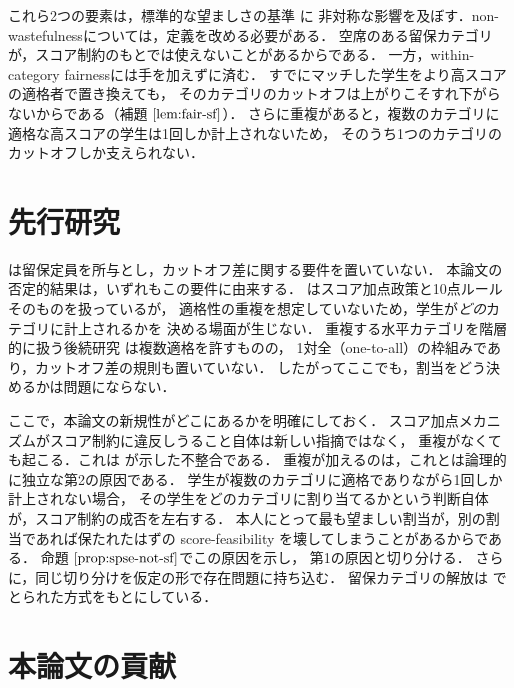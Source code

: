 \documentclass[
    12pt,          %
    a4paper,       %
    oneside,       %
    onecolumn,     %
    titlepage,     %
    final          %
]{jreport} %
\newcommand{\refpropositional}[1]{命題 $\ref{#1}$}
\newcommand{\reflemma}[1]{補題 $\ref{#1}$}
\begin{document}
これら2つの要素は，標準的な望ましさの基準 \citep{EHYY14a,KHIY17a,GKK+17a} に
非対称な影響を及ぼす．non-wastefulnessについては，定義を改める必要がある．
空席のある留保カテゴリが，スコア制約のもとでは使えないことがあるからである．
一方，within-category fairnessには手を加えずに済む．
すでにマッチした学生をより高スコアの適格者で置き換えても，
そのカテゴリのカットオフは上がりこそすれ下がらないからである（\reflemma{lem:fair-sf}）．
さらに重複があると，複数のカテゴリに適格な高スコアの学生は1回しか計上されないため，
そのうち1つのカテゴリのカットオフしか支えられない．

\section{先行研究}
\label{sec:related}

\citet{SoYe22a} は留保定員を所与とし，カットオフ差に関する要件を置いていない．
本論文の否定的結果は，いずれもこの要件に由来する．
\citet{AyTu23b} はスコア加点政策と10点ルールそのものを扱っているが，
適格性の重複を想定していないため，学生が\emph{どの}カテゴリに計上されるかを
決める場面が生じない．
重複する水平カテゴリを階層的に扱う後続研究 \citep{AyTu26a} は複数適格を許すものの，
1対全（one-to-all）の枠組みであり，カットオフ差の規則も置いていない．
したがってここでも，割当をどう決めるかは問題にならない．

ここで，本論文の新規性がどこにあるかを明確にしておく．
スコア加点メカニズムがスコア制約に違反しうること自体は新しい指摘ではなく，
重複がなくても起こる．これは \citet{AyTu23b} が示した不整合である．
重複が加えるのは，これとは論理的に独立な第2の原因である．
学生が複数のカテゴリに適格でありながら1回しか計上されない場合，
その学生をどのカテゴリに割り当てるかという判断自体が，スコア制約の成否を左右する．
本人にとって最も望ましい割当が，別の割当であれば保たれたはずの
score-feasibility を壊してしまうことがあるからである．
\refpropositional{prop:spse-not-sf}でこの原因を示し，
第1の原因と切り分ける．
さらに，同じ切り分けを仮定の形で存在問題に持ち込む．
留保カテゴリの解放は \citet{AyTu23a} でとられた方式をもとにしている．

\section{本論文の貢献}
\label{sec:contrib}
\end{document}
